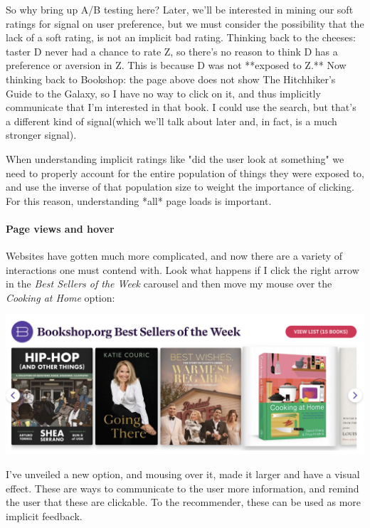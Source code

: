 So why bring up A/B testing here? Later, we'll be interested in mining our soft ratings for signal on user preference, but we must consider the possibility that the lack of a soft rating, is not an implicit bad rating. Thinking back to the cheeses: taster D never had a chance to rate Z, so there's no reason to think D has a preference or aversion in Z. This is because D was not **exposed to Z.** Now thinking back to Bookshop: the page above does not show The Hitchhiker's Guide to the Galaxy, so I have no way to click on it, and thus implicitly communicate that I'm interested in that book. I could use the search, but that's a different kind of signal(which we'll talk about later and, in fact, is a much stronger signal).

When understanding implicit ratings like "did the user look at something" we need to properly account for the entire population of things they were exposed to, and use the inverse of that population size to weight the importance of clicking. For this reason, understanding *all* page loads is important.

\paragraph{Page views and hover}

Websites have gotten much more complicated, and now there are a variety of interactions one must contend with. Look what happens if I click the right arrow in the \emph{Best Sellers of the Week} carousel and then move my mouse over the \emph{Cooking at Home} option:


\vspace{10pt}
\includegraphics[width=\textwidth-10pt]{book-text/bookshop-top-sellers.png}

I've unveiled a new option, and mousing over it, made it larger and have a visual effect. These are ways to communicate to the user more information, and remind the user that these are clickable. To the recommender, these can be used as more implicit feedback.

